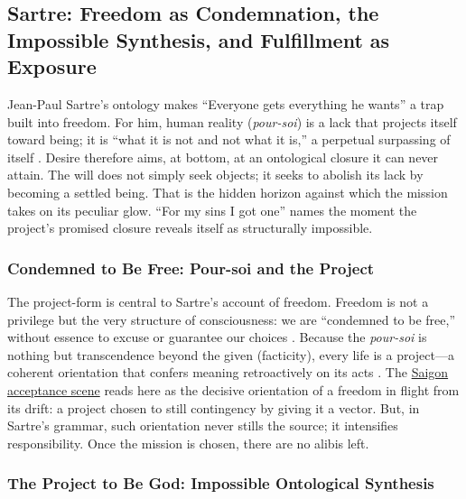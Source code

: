 \subsection*{Sartre: Freedom as Condemnation, the Impossible Synthesis, and Fulfillment as
	Exposure}
\label{ssec:iii-sartre}
Jean-Paul Sartre's ontology makes ``Everyone gets everything he wants'' a trap built into
freedom. For him, human reality (\emph{pour-soi}) is a lack that projects itself toward being;
it is ``what
it is not and not what it is,'' a perpetual surpassing of itself
\parencite[pp.~100--110]{SartreBN2003}. Desire therefore aims, at bottom, at an ontological
closure it can never attain. The will does not simply seek objects; it seeks to abolish its
lack by becoming a settled being. That is the hidden horizon against which the mission takes on
its peculiar glow. ``For my sins I got one'' names the moment the project's promised closure
reveals itself as structurally impossible.

\subsubsection*{Condemned to Be Free: Pour-soi and the Project}

The project-form is central to Sartre's account of freedom. Freedom is not a privilege but the
very structure of consciousness: we are ``condemned to be free,'' without essence to excuse or
guarantee our choices \parencite[pp.~34--36]{SartreBN2003}. Because the \emph{pour-soi} is
nothing but transcendence beyond the given (facticity), every life is a project—a coherent
orientation that confers meaning retroactively on its acts
\parencite[pp.~561--569]{SartreBN2003}. The \hyperref[scene:briefing]{Saigon acceptance scene}
reads here as the decisive orientation of a freedom in flight from its drift: a project chosen
to still contingency by giving it a vector. But, in Sartre's grammar, such orientation never
stills the source; it intensifies responsibility. Once the mission is chosen, there are no
alibis left.

\subsubsection*{The Project to Be God: Impossible Ontological Synthesis}

